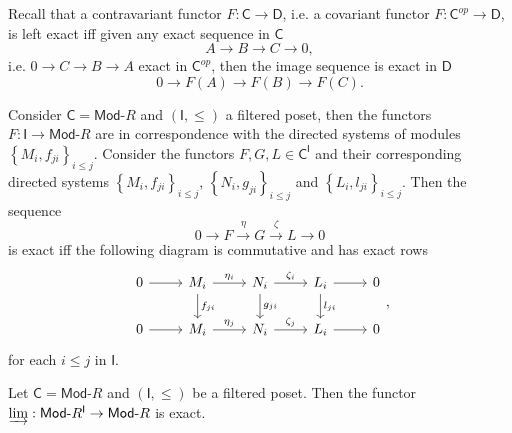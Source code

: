 \begin{rem}
	Recall that a contravariant functor $F: \mathsf{C} \to \mathsf{D}$, i.e. a covariant functor $F: \mathsf{C}^{op} \to \mathsf{D}$, 
	is left exact iff given any exact sequence in $\mathsf{C}$ 
	\begin{equation}
	A \to B \to C \to 0
	,\end{equation} 
	i.e. $0 \to C \to B \to A$ exact in $\mathsf{C}^{op}$, then the image sequence is exact in $\mathsf{D}$
	\begin{equation}
		0 \to F(A) \to F(B) \to F(C)
	.\end{equation} 
\end{rem}
\begin{rem}
Consider $\mathsf{C} = \mathsf{Mod}\text{-}R$ and $\left(\mathsf{I}, \leq \right)$ a filtered poset, then
the functors $F: \mathsf{I} \to \mathsf{Mod}\text{-}R$ are in correspondence
with the directed systems of modules
$\left\{ M_i, f_{ji} \right\}_{i \leq j }$.
Consider the functors $F, G, L \in \mathsf{C}^{\mathsf{I}}$ and their corresponding
directed systems $\left\{ M_i, f_{ji} \right\}_{i \leq j}$, $\left\{ N_i, g_{ji} \right\}_{i \leq j}$
and $\left\{ L_i, l_{ji} \right\}_{i \leq j}$.
Then the sequence 
\begin{equation}
0 \to F \xrightarrow{\eta} G \xrightarrow{\zeta} L \to 0
\end{equation} 
is exact iff the following diagram is commutative and has exact rows
\begin{equation}
\begin{tikzcd}
	0 \arrow[r, "", rightarrow] &
	M_i \arrow[r, "\eta_i", rightarrow] \arrow[d, "f_{ji}", rightarrow] &
	N_i \arrow[r, "\zeta_i", rightarrow] \arrow[d, "g_{ji}", rightarrow] &
	L_i \arrow[r, "", rightarrow] \arrow[d, "l_{ji}", rightarrow] &
	0 \\
	0 \arrow[r, "", rightarrow] &
	M_i \arrow[r, "\eta_j", rightarrow] &
	N_i \arrow[r, "\zeta_j", rightarrow] &
	L_i \arrow[r, "", rightarrow] &
	0
\end{tikzcd}
,\end{equation} 
for each $i \leq j$ in $\mathsf{I}$.
\end{rem} 

\begin{prop}
	Let $\mathsf{C} = \mathsf{Mod}\text{-}R$ and $\left(\mathsf{I}, \leq \right)$ be a filtered poset.
	Then the functor $\varinjlim: \mathsf{Mod}\text{-}R^{\mathsf{I}} \to \mathsf{Mod}\text{-}R$ is exact.
\end{prop} 

